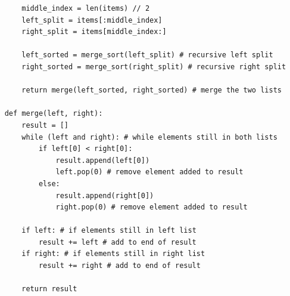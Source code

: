 \documentclass[11pt, a4paper]{article}
\begin{document}
\begin{spacing}{1.1}
\begin{lstlisting}
		middle_index = len(items) // 2
		left_split = items[:middle_index]
		right_split = items[middle_index:]
		
		left_sorted = merge_sort(left_split) # recursive left split
		right_sorted = merge_sort(right_split) # recursive right split
		
		return merge(left_sorted, right_sorted) # merge the two lists
	
	def merge(left, right):
		result = []
		while (left and right): # while elements still in both lists
			if left[0] < right[0]:
				result.append(left[0])
				left.pop(0) # remove element added to result
			else:
				result.append(right[0])
				right.pop(0) # remove element added to result
		
		if left: # if elements still in left list
			result += left # add to end of result
		if right: # if elements still in right list
			result += right # add to end of result
		
		return result \end{lstlisting} \vspace*{1mm}

\end{spacing}
\end{document}
